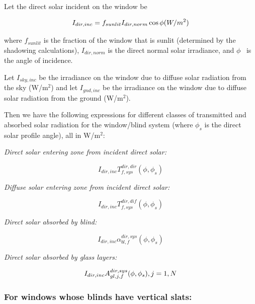 Let the direct solar incident on the window be

\begin{equation}
{I_{dir,inc}} = {f_{sunlit}}{I_{dir,norm}}\cos \phi {\rm{    }}(W/{m^2})
\end{equation}

where \({f_{sunlit}}\) is the fraction of the window that is sunlit (determined by the shadowing calculations), \({I_{dir,norm}}\) is the direct normal solar irradiance, and \(\phi\) ~is the angle of incidence.

Let \({I_{sky,inc}}\) be the irradiance on the window due to diffuse solar radiation from the sky (W/m\(^{2}\)) and let \({I_{gnd,inc}}\) be the irradiance on the window due to diffuse solar radiation from the ground (W/m\(^{2}\)).

Then we have the following expressions for different classes of transmitted and absorbed solar radiation for the window/blind system (where \({\phi_s}\) is the direct solar profile angle), all in W/m\(^{2}\):

\emph{Direct solar entering zone from incident direct solar:}

\begin{equation}
{I_{dir,inc}}T_{f,sys}^{dir,dir}(\phi ,{\phi_s})
\end{equation}

\emph{Diffuse solar entering zone from incident direct solar:}

\begin{equation}
{I_{dir,inc}}T_{f,sys}^{dir,dif}(\phi ,{\phi_s})
\end{equation}

\emph{Direct solar absorbed by blind:}

\begin{equation}
{I_{dir,inc}}\alpha_{bl,f}^{dir,sys}(\phi ,{\phi_s})
\end{equation}

\emph{Direct solar absorbed by glass layers:}

\begin{equation}
{I_{dir,inc}}A_{gl,j,f}^{dir,sys}(\phi ,{\phi_s}),{\rm{    }}j = 1,N
\end{equation}

\subsubsection{For windows whose blinds have vertical slats:}\label{for-windows-whose-blinds-have-vertical-slats}


